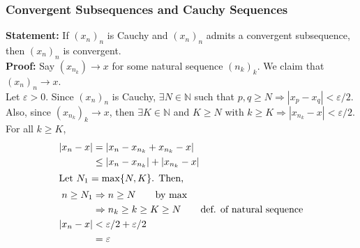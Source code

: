 \documentclass[10pt]{extarticle}
\newcommand{\N}{\mathbb{N}}
\begin{document}
    \subsubsection{Convergent Subsequences and Cauchy Sequences}%
    \textbf{Statement:} If $(x_n)_n$ is Cauchy and $(x_n)_n$ admits a convergent subsequence, then $(x_n)_n$ is convergent.\\

    \textbf{Proof:} Say $(x_{n_k})\rightarrow x$ for some natural sequence $(n_k)_k$. We claim that $(x_n)_n\rightarrow x$.\\

      Let $\varepsilon > 0$. Since $(x_n)_n$ is Cauchy, $\exists N\in\N$ such that $p,q\geq N \Rightarrow |x_p-x_q| < \varepsilon/2$.\\

      Also, since $(x_{n_k})_k \rightarrow x$, then $\exists K\in\N$ and $K\geq N$ with $k\geq K \Rightarrow |x_{n_k} - x| < \varepsilon/2$.\\

      For all $k\geq K$,
      \begin{align*}
        |x_n - x| &= |x_n - x_{n_k} + x_{n_k} - x|\\
                  &\leq |x_n - x_{n_k}| + |x_{n_k} - x|\\
        \shortintertext{Let $N_1 = \max\{N,K\}$. Then,}
        n \geq N_1 &\Rightarrow n\geq N \tag*{by $\max$}\\
                   &\Rightarrow n_k \geq k \geq K \geq N \tag*{def. of natural sequence}\\
        |x_n - x| &< \varepsilon/2 + \varepsilon/2\\
                  &= \varepsilon
      \end{align*}
\end{document}
